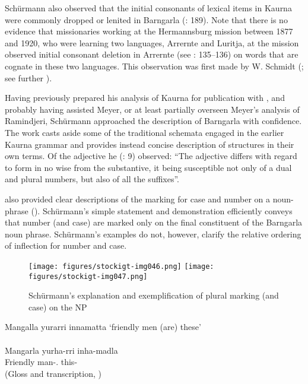 Schürmann also observed that the initial consonants of lexical items in Kaurna were commonly dropped or lenited in Barngarla (\citealt{simpson_thura-yura_2004}: 189). Note that there is no evidence that missionaries working at the Hermannsburg mission between 1877 and 1920, who were learning two languages, Arrernte and Luritja, at the mission observed initial consonant deletion in Arrernte (see \citealt{koch_methodological_2004}: 135--136) on words that are cognate in these two languages. This observation was first made by W. Schmidt (\citeyear[50]{schmidt_gliederung_1919}; see further \citealt[24]{koch_arandic_2004}).


Having previously prepared his analysis of Kaurna for publication with \citet{teichelmann_outlines_1840}, and probably having assisted Meyer, or at least partially overseen Meyer’s analysis of Ramindjeri, Schürmann approached the description of Barngarla with confidence. The work casts aside some of the traditional schemata engaged in the earlier Kaurna grammar and provides instead concise description of structures in their own terms. Of the adjective he (\citeyear{schurmann_letter_1844}: 9) observed: “The adjective differs with regard to form in no wise from the substantive, it being susceptible not only of a dual and plural numbers, but also of all the suffixes”.

\citet[9--10]{schurmann_vocabulary_1844} also provided clear descriptions of the marking for case and number on a noun-phrase (). Schürmann’s simple statement and demonstration efficiently conveys that number (and case) are marked only on the final constituent of the Barngarla noun phrase. Schürmann’s examples do not, however, clarify the relative ordering of inflection for number and case.


\begin{figure}
\texttt{[image: figures/stockigt-img046.png]}
\texttt{[image: figures/stockigt-img047.png]}
\caption{Schürmann’s explanation and exemplification of plural marking (and case) on the NP \citeyearpar[9--10]{schurmann_vocabulary_1844}}
\label{fig:key:105}
\end{figure}


\ea %
	Mangalla yurarri innamatta
	\glt `friendly men (are) these' \\
	\citep[10]{Schürmann1844} \\
	\gll Mangarla yurha-rri inha-madla \\
	Friendly man-.    this-\\
	\glt (Gloss and transcription, \citealt[161]{Clendon2015})
\z

